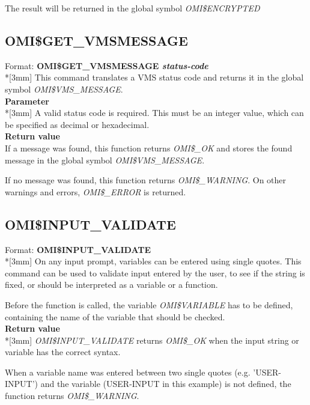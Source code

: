 \documentclass[a4paper]{book}
\newcommand{\vs}{\vspace{3mm}}
\renewcommand{\indent}{\hspace*{5mm}}
\begin{document}
\noindent The result will be returned in the global symbol \textsl{OMI{\$}ENCRYPTED}

\subsection{OMI{\$}GET{\_}VMSMESSAGE}
\label{subsubsec:mylabel55}

\indent Format: \textbf{OMI{\$}GET{\_}VMSMESSAGE \textit{status-code}}\\*[3mm]
This command translates a VMS status code and returns it in the global 
symbol \textsl{OMI{\$}VMS{\_}MESSAGE}.\\[3mm]
\textbf{Parameter}\\*[3mm]
A valid status code is required. This must be an integer value, which can be 
specified as decimal or hexadecimal. \\[3mm]
\textbf{Return value}\\[3mm]
If a message was found, this function returns \textsl{OMI{\$}{\_}OK} and stores the 
found message in the global symbol \textsl{OMI{\$}VMS{\_}MESSAGE}.

If no message was found, this function returns \textsl{OMI{\$}{\_}WARNING}. On other 
warnings and errors, \textsl{OMI{\$}{\_}ERROR} is returned.

\subsection{OMI{\$}INPUT{\_}VALIDATE}
\label{subsubsec:mylabel56}

\indent Format: \textbf{OMI{\$}INPUT{\_}VALIDATE}\\*[3mm]
On any input prompt, variables can be entered using single quotes. This 
command can be used to validate input entered by the user, to see if the 
string is fixed, or should be interpreted as a variable or a function.

\vs

Before the function is called, the variable \textsl{OMI{\$}VARIABLE} has to be 
defined, containing the name of the variable that should be checked.\\[3mm]
\textbf{Return value}\\*[3mm]
\textsl{OMI{\$}INPUT{\_}VALIDATE} returns \textsl{OMI{\$}{\_}OK} when the input 
string or variable has the correct syntax.

When a variable name was entered between two single quotes (e.g. 'USER-INPUT') 
and the variable (USER-INPUT in this example) is not defined, the function 
returns \textsl{OMI{\$}{\_}WARNING}.
\end{document}
